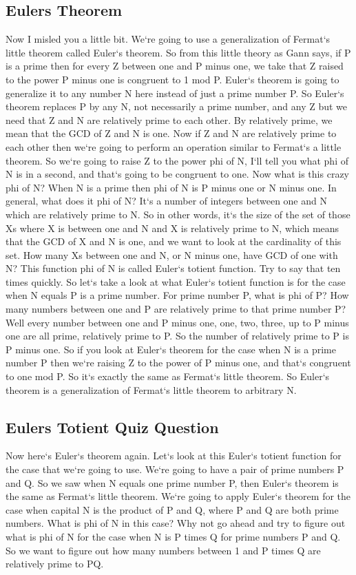 \subsection{Eulers Theorem}
Now I misled you a little bit.
We`re going to use a generalization of Fermat`s little theorem called Euler`s theorem.
So from this little theory as Gann says, if P is a prime then for every Z between one and P minus one, we take that Z raised to the power P minus one is congruent to 1 mod P\@.
Euler`s theorem is going to generalize it to any number N here instead of just a prime number P\@.
So Euler`s theorem replaces P by any N, not necessarily a prime number, and any Z but we need that Z and N are relatively prime to each other.
By relatively prime, we mean that the GCD of Z and N is one.
Now if Z and N are relatively prime to each other then we`re going to perform an operation similar to Fermat`s a little theorem.
So we`re going to raise Z to the power phi of N, I`ll tell you what phi of N is in a second, and that`s going to be congruent to one.
Now what is this crazy phi of N? When N is a prime then phi of N is P minus one or N minus one.
In general, what does it phi of N? It`s a number of integers between one and N which are relatively prime to N\@.
So in other words, it`s the size of the set of those Xs where X is between one and N and X is relatively prime to N, which means that the GCD of X and N is one, and we want to look at the cardinality of this set.
How many Xs between one and N, or N minus one, have GCD of one with N? This function phi of N is called Euler`s totient function.
Try to say that ten times quickly.
So let`s take a look at what Euler`s totient function is for the case when N equals P is a prime number.
For prime number P, what is phi of P? How many numbers between one and P are relatively prime to that prime number P? Well every number between one and P minus one, one, two, three, up to P minus one are all prime, relatively prime to P\@.
So the number of relatively prime to P is P minus one.
So if you look at Euler`s theorem for the case when N is a prime number P then we`re raising Z to the power of P minus one, and that`s congruent to one mod P\@.
So it`s exactly the same as Fermat`s little theorem.
So Euler`s theorem is a generalization of Fermat`s little theorem to arbitrary N\@.

\subsection{Eulers Totient Quiz Question}
Now here`s Euler`s theorem again.
Let`s look at this Euler`s totient function for the case that we`re going to use.
We`re going to have a pair of prime numbers P and Q\@.
So we saw when N equals one prime number P, then Euler`s theorem is the same as Fermat`s little theorem.
We`re going to apply Euler`s theorem for the case when capital N is the product of P and Q, where P and Q are both prime numbers.
What is phi of N in this case? Why not go ahead and try to figure out what is phi of N for the case when N is P times Q for prime numbers P and Q\@.
So we want to figure out how many numbers between 1 and P times Q are relatively prime to PQ\@.

